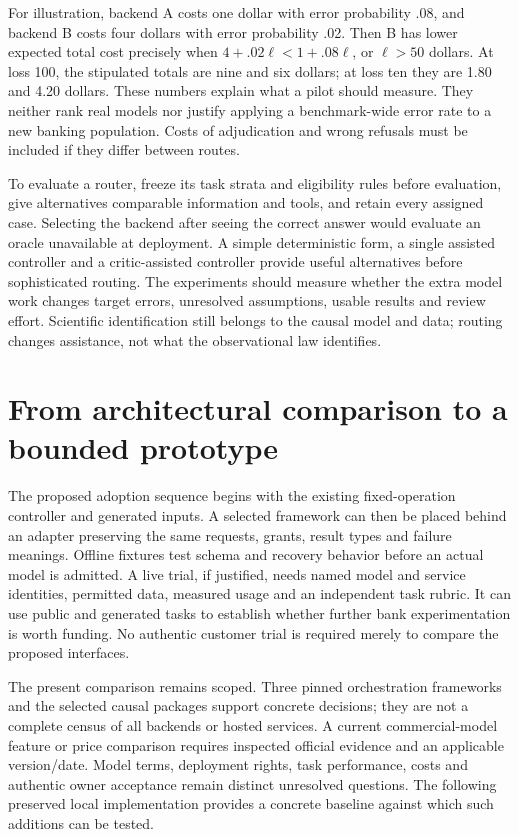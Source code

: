 For illustration, backend A costs one dollar with error probability .08,
and backend B costs four dollars with error probability .02. Then B has
lower expected total cost precisely when
$4+.02\ell<1+.08\ell$, or $\ell>50$ dollars. At loss 100, the stipulated
totals are nine and six dollars; at loss ten they are 1.80 and 4.20 dollars.
These numbers explain what a pilot should measure. They neither rank real
models nor justify applying a benchmark-wide error rate to a new banking
population. Costs of adjudication and wrong refusals must be included if
they differ between routes.\cite{exec14_l6_exact}

To evaluate a router, freeze its task strata and eligibility rules before
evaluation, give alternatives comparable information and tools, and retain
every assigned case. Selecting the backend after seeing the correct answer
would evaluate an oracle unavailable at deployment. A simple deterministic
form, a single assisted controller and a critic-assisted controller provide
useful alternatives before sophisticated routing. The experiments should
measure whether the extra model work changes target errors, unresolved
assumptions, usable results and review effort. Scientific identification
still belongs to the causal model and data; routing changes assistance,
not what the observational law identifies.

\section{From architectural comparison to a bounded prototype}

The proposed adoption sequence begins with the existing fixed-operation
controller and generated inputs. A selected framework can then be placed
behind an adapter preserving the same requests, grants, result types and
failure meanings. Offline fixtures test schema and recovery behavior before
an actual model is admitted. A live trial, if justified, needs named model
and service identities, permitted data, measured usage and an independent
task rubric. It can use public and generated tasks to establish whether
further bank experimentation is worth funding. No authentic customer
trial is required merely to compare the proposed interfaces.

The present comparison remains scoped. Three pinned orchestration
frameworks and the selected causal packages support concrete decisions;
they are not a complete census of all backends or hosted services. A
current commercial-model feature or price comparison requires inspected
official evidence and an applicable version/date. Model terms, deployment
rights, task performance, costs and authentic owner acceptance remain
distinct unresolved questions. The following preserved local implementation
provides a concrete baseline against which such additions can be tested.
\cite{exec14_l6_design,exec14_l6_local}

\label{exec14:l6-extension-end}
